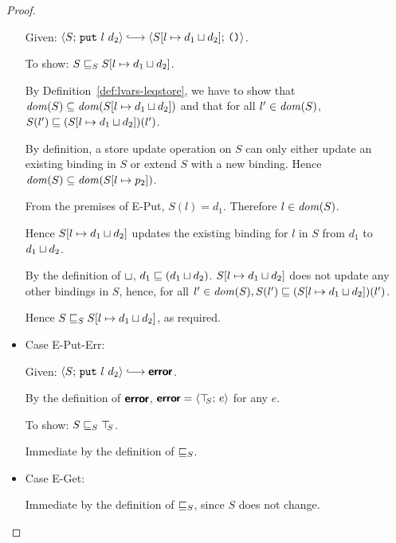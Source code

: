 \begin{proof}
\begin{itemize}
      Given: $\config{S}{\putexp{l}{d_2}} \parstepsto
      \config{\extSRaw{S}{l}{\userlub{d_1}{d_2}}}{\unit}$.

      To show: $S \sqsubseteq_S S[l \mapsto d_1 \sqcup d_2]$.

      By Definition~\ref{def:lvars-leqstore}, we have to show that
      $\mathit{dom}(S) \subseteq \mathit{dom}(S[l \mapsto d_1 \sqcup d_2])$ and
      that for all $l' \in \mathit{dom}(S)$, $S(l') \sqsubseteq
      (S[l \mapsto d_1 \sqcup d_2])(l')$.

      By definition, a store update operation on $S$ can only either
      update an existing binding in $S$ or extend $S$ with a new
      binding.  Hence $\mathit{dom}(S) \subseteq \mathit{dom}(S[l \mapsto p_2])$.

      From the premises of {\sc E-Put}, $S(l) = d_1$.  Therefore $l
      \in \mathit{dom}(S)$.

      Hence $S[l \mapsto d_1 \sqcup d_2]$ updates the existing
      binding for $l$ in $S$ from $d_1$ to $d_1 \sqcup d_2$.

      By the definition of $ \sqcup $, $d_1 \sqsubseteq
      (d_1 \sqcup d_2)$.  $S[l \mapsto d_1 \sqcup d_2]$
      does not update any other bindings in $S$, hence, for all $l'
      \in \mathit{dom}(S), S(l') \sqsubseteq
      (S[l \mapsto d_1 \sqcup d_2])(l')$.

      Hence $S \sqsubseteq_S S[l \mapsto d_1 \sqcup d_2]$, as
      required.

    \item Case {\sc E-Put-Err}:

      Given: $\config{S}{\putexp{l}{d_2}} \parstepsto \error$.

      By the definition of $\textbf{\textsf{error}}$, $\textbf{\textsf{error}} = \langle \top\hspace{-0.85mm}_{S};\, e \rangle$ for
      any $e$.

      To show: $S \sqsubseteq_S \top\hspace{-0.85mm}_{S}$.

      Immediate by the definition of $ \sqsubseteq_S $.

    \item Case {\sc E-Get}:

      Immediate by the definition of $ \sqsubseteq_S $, since $S$ does
      not change.

  \end{itemize}

\end{proof}
